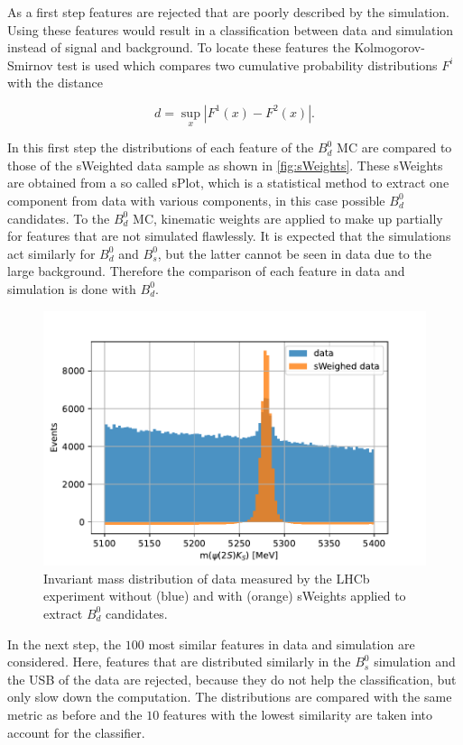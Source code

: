 As a first step features are rejected that are poorly described by the simulation. Using these features would result in a classification between data and simulation instead of signal and background. To locate these features the Kolmogorov-Smirnov test is used which compares two cumulative probability distributions $F^i$ with the distance

\begin{equation*}
  d = \sup_x \left|F^1(x) - F^2(x)\right|.
\end{equation*}

In this first step the distributions of each feature of the $B^0_d$ MC are compared to those of the sWeighted data sample as shown in \autoref{fig:sWeights}. These sWeights are obtained from a so called sPlot, which is a statistical method to extract one component from data with various components, in this case possible $B^0_d$ candidates. To the $B^0_d$ MC, kinematic weights are applied to make up partially for features that are not simulated flawlessly. It is expected that the simulations act similarly for $B^0_d$ and $B^0_s$, but the latter cannot be seen in data due to the large background. Therefore the comparison of each feature in data and simulation is done with $B^0_d$.

\begin{figure}[H]
  \centering
  \includegraphics[width=12cm]{plots/sweights.pdf}
  \caption{Invariant mass distribution of data measured by the LHCb experiment without (blue) and with (orange) sWeights applied to extract $B^0_d$ candidates.}
  \label{fig:sWeights}
\end{figure}

In the next step, the $\num{100}$ most similar features in data and simulation are considered. Here, features that are distributed similarly in the $B^0_s$ simulation and the USB of the data are rejected, because they do not help the classification, but only slow down the computation. The distributions are compared with the same metric as before and the $\num{10}$ features with the lowest similarity are taken into account for the classifier.

